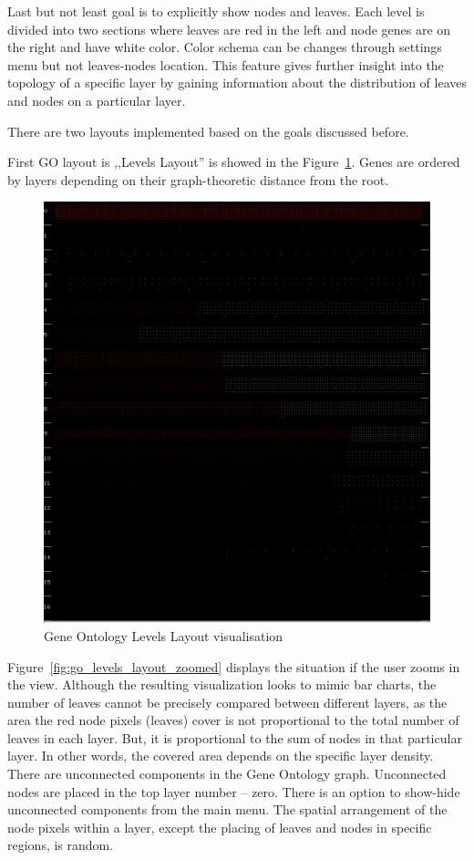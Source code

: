 Last but not least goal is to explicitly show nodes and leaves. Each level is divided into two sections where leaves are red in the left and node genes are on the right and have white color. Color schema can be changes through settings menu but not leaves-nodes location. This feature gives further insight into the topology of a specific layer by gaining information about the distribution of leaves and nodes on a particular layer.

There are two layouts implemented based on the goals discussed before.

First GO layout is ,,Levels Layout'' is showed in the Figure~\ref{fig:go_levels_layout}. Genes are ordered by layers depending on their graph-theoretic distance from the root.

\begin{figure}[h!]
\centering
\includegraphics[scale=0.3]{pictures/go_levels_layout.png}
\caption{Gene Ontology Levels Layout visualisation}
\label{fig:go_levels_layout}
\end{figure}

Figure~\ref{fig:go_levels_layout_zoomed} displays the situation if the user zooms in the view. Although the resulting visualization looks to mimic bar charts, the number of leaves cannot be precisely compared between different layers, as the area the red node pixels (leaves) cover is not proportional to the total number of leaves in each layer. But, it is proportional to the sum of nodes in that particular layer. In other words, the covered area depends on the specific layer density. There are unconnected components in the Gene Ontology graph. Unconnected nodes are placed in the top layer number -- zero. There is an option to show-hide unconnected components from the main menu. The spatial arrangement of the node pixels within a layer, except the placing of leaves and nodes in specific regions, is random.

